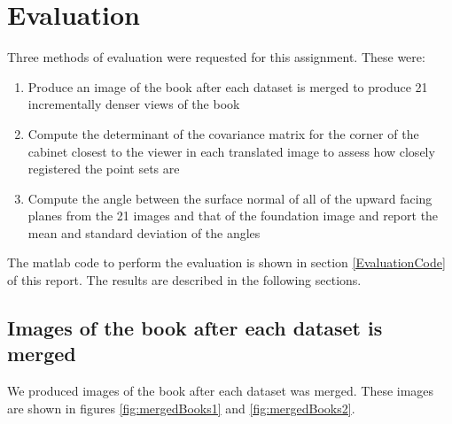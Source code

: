 \section{Evaluation}

Three methods of evaluation were requested for this assignment. These were:

\begin{enumerate}
	\item Produce an image of the book after each dataset is merged to produce 21 incrementally denser views of the book
	\item Compute the determinant of the covariance matrix for the corner of the cabinet closest to the viewer in each translated image to assess how closely registered the point sets are
	\item Compute the angle between the surface normal of all of the upward facing planes from the 21 images and that of the foundation image and report the mean and standard deviation of the angles
\end{enumerate}

The matlab code to perform the evaluation is shown in section \ref{EvaluationCode} of this report. The results are described in the following sections.

\subsection{Images of the book after each dataset is merged}

We produced images of the book after each dataset was merged. These images are shown in figures \ref{fig:mergedBooks1} and \ref{fig:mergedBooks2}.

